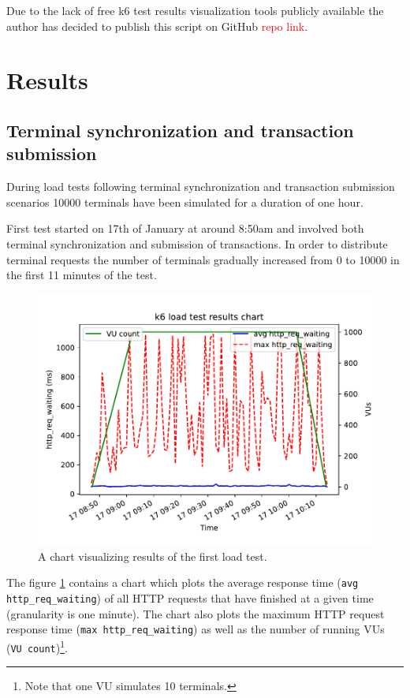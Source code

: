 \documentclass[12pt, a4paper]{article}
\newcommand\todo[1]{\textcolor{red}{#1}}
\let\oldsection\section
\renewcommand\section{\clearpage\oldsection}
\begin{document}
Due to the lack of free k6 test results visualization tools publicly available the author has decided to publish this script on GitHub \todo{repo link}.

\section{Results}

\subsection{Terminal synchronization and transaction submission}
During load tests following terminal synchronization and transaction submission scenarios 10000 terminals have been simulated for a duration of one hour.

First test started on 17th of January at around 8:50am and involved both terminal synchronization and submission of transactions.
In order to distribute terminal requests the number of terminals gradually increased from 0 to 10000 in the first 11 minutes of the test.

\begin{figure}[!ht]
    \centering 
    \includegraphics[width=1\textwidth]{pdf/avg-waiting-time-1.pdf}
    \caption{A chart visualizing results of the first load test.}
    \label{fig:waiting-time-1}
\end{figure}

The figure \ref{fig:waiting-time-1} contains a chart which plots the average response time (\texttt{avg http\_req\_waiting}) of all HTTP requests that have finished at a given time (granularity is one minute).
The chart also plots the maximum HTTP request response time (\texttt{max http\_req\_waiting}) as well as the number of running VUs (\texttt{VU count})\footnote{Note that one VU simulates 10 terminals.}.
\end{document}

